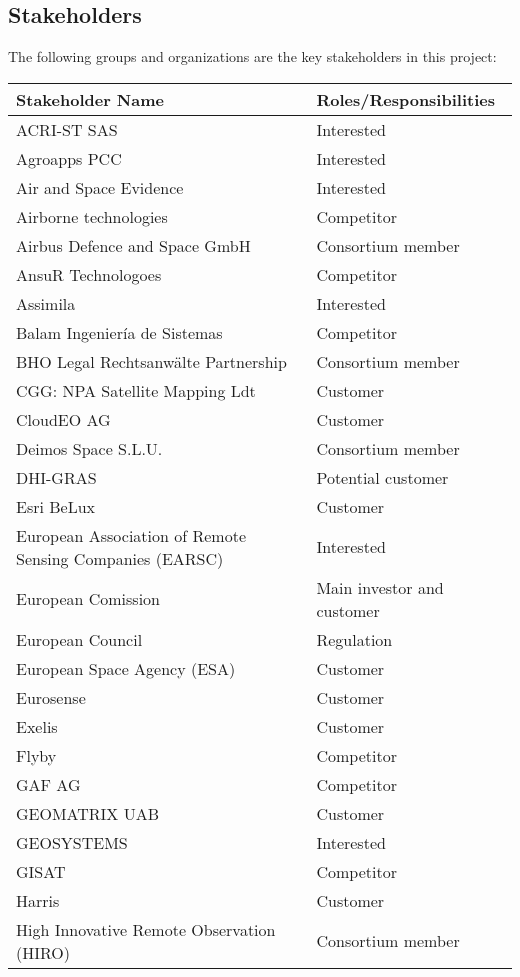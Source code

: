 \subsection{Stakeholders}
The following groups and organizations are the key stakeholders in this project:
\begin{center}


\begin{longtable}{ll}
\toprule[2pt]
\textbf{Stakeholder Name  }                  & \textbf{Roles/Responsibilities                                                                                                                  } \\ \midrule[1.5pt]
ACRI-ST SAS&Interested\\
Agroapps PCC&Interested\\
Air and Space Evidence&Interested\\
Airborne technologies&Competitor\\
Airbus Defence and Space GmbH & Consortium member  \\ 
AnsuR Technologoes&Competitor\\
Assimila&Interested\\
Balam Ingeniería de Sistemas&Competitor\\
BHO Legal Rechtsanwälte Partnership & Consortium member\\ 
CGG: NPA Satellite Mapping Ldt&Customer\\
CloudEO AG&Customer\\
Deimos Space S.L.U.  & Consortium member \\
DHI-GRAS&Potential customer\\
Esri BeLux&Customer\\
European Association of Remote Sensing Companies (EARSC)&Interested\\
European Comission&Main investor and customer\\
European Council&Regulation\\
European Space Agency (ESA)&Customer\\ 
Eurosense&Customer\\
Exelis&Customer\\
Flyby&Competitor\\
GAF AG&Competitor\\
GEOMATRIX UAB&Customer\\
GEOSYSTEMS&Interested\\
GISAT&Competitor\\
Harris&Customer\\
High Innovative Remote Observation (HIRO) & Consortium member \\ 

\end{longtable}
\end{center}
